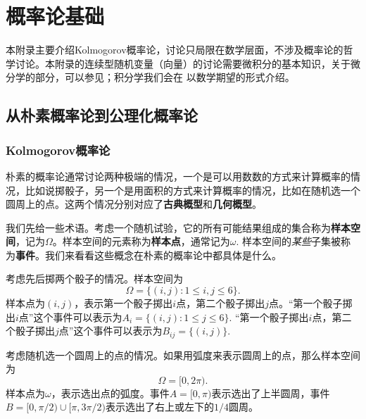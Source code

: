 \chapter{概率论基础}\label{chap:prob}

\begingroup
\newcommand{\B}{\mathscr{B}}
\renewcommand{\F}{\mathscr{F}}
\newcommand{\Exp}{\mathsf{Exp}}
\newcommand{\DExp}{\mathsf{DExp}}
\newcommand{\Lap}{\mathsf{Lap}}

本附录主要介绍Kolmogorov概率论，讨论只局限在数学层面，不涉及概率论的哲学讨论。本附录的连续型随机变量（向量）的讨论需要微积分的基本知识，关于微分学的部分，可以参见；积分学我们会在 以数学期望的形式介绍。

\section{从朴素概率论到公理化概率论}

\subsection{Kolmogorov概率论}\label{subsec:kolmogorov-probability}
朴素的概率论通常讨论两种极端的情况，一个是可以用数数的方式来计算概率的情况，比如说掷骰子，另一个是用面积的方式来计算概率的情况，比如在随机选一个圆周上的点。这两个情况分别对应了\textbf{古典概型}和\textbf{几何概型}。

我们先给一些术语。考虑一个随机试验，它的所有可能结果组成的集合称为\textbf{样本空间}，记为$\Omega$。样本空间的元素称为\textbf{样本点}，通常记为$\omega$. 样本空间的\emph{某些}子集被称为\textbf{事件}。我们来看看这些概念在朴素的概率论中都具体是什么。

\begin{example}[古典概型]
考虑先后掷两个骰子的情况。样本空间为
\[
    \Omega = \{ (i, j): 1 \leq i, j \leq 6 \}.
\]
样本点为$(i, j)$，表示第一个骰子掷出$i$点，第二个骰子掷出$j$点。“第一个骰子掷出$i$点”这个事件可以表示为$A_i = \{ (i, j): 1 \leq j \leq 6 \}$. “第一个骰子掷出$i$点，第二个骰子掷出$j$点”这个事件可以表示为$B_{ij} = \{ (i, j) \}$.
\end{example}

\begin{example}[几何概型]
考虑随机选一个圆周上的点的情况。如果用弧度来表示圆周上的点，那么样本空间为
\[
    \Omega = [0, 2\pi).
\]
样本点为$\omega$，表示选出点的弧度。事件$A = [0, \pi)$表示选出了上半圆周，事件$B = [0, \pi/2)\cup[\pi, 3\pi/2)$表示选出了右上或左下的$1/4$圆周。
\end{example}

